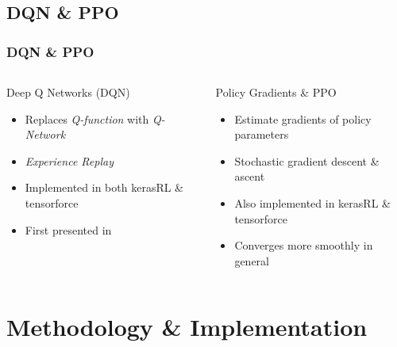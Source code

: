 \documentclass[aspectratio=1610]{beamer}
\begin{document}
\subsection{DQN \& PPO}
\begin{frame}
  \frametitle{\hfill DQN \& PPO}
  \begin{columns}[t]
    \begin{block}{Deep Q Networks (DQN)}
    \begin{itemize}
        \item Replaces \textit{Q-function} with \textit{Q-Network}
        \item \textit{Experience Replay}
        \item Implemented in both kerasRL \& tensorforce
        \item First presented in \textcite{mnih2015human}
    \end{itemize}
    \end{block}
    
    \begin{block}{Policy Gradients \& PPO}
    \begin{itemize}
        \item Estimate gradients of policy parameters
        \item Stochastic gradient descent \& ascent \parencite{schulman2017proximal}
        \item Also implemented in kerasRL \& tensorforce
        \item Converges more smoothly in general
    \end{itemize}
    \end{block}
\end{columns}

\end{frame}



\section{Methodology \& Implementation}
\end{document}
